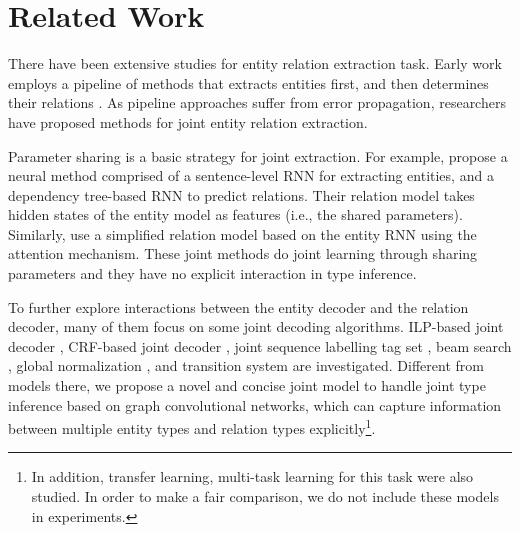 \section{Related Work}
There have been extensive studies for entity relation extraction task.
Early work employs a pipeline of methods that extracts entities first,
and then determines their relations \citep{zelenko2003kernel,miwa-EtAl:2009:EMNLP,chan-roth:2011:ACL-HLT2011,lin-EtAl:2016:P16-1}.
As pipeline approaches suffer from error propagation, 
researchers have proposed methods for joint entity relation extraction.

Parameter sharing is a basic strategy for joint extraction.
For example,
\citet{miwa-bansal:2016:P16-1} propose a neural method comprised of 
a sentence-level RNN for extracting entities,
and a dependency tree-based RNN to predict relations.
Their relation model takes hidden states of the entity model as features
(i.e., the shared parameters).
Similarly,
\citet{katiyar-cardie:2017:Long} use a simplified relation model
based on the entity RNN using the attention mechanism.
These joint methods do joint learning through sharing parameters and they have no explicit interaction in type inference. 

To further explore interactions between the entity decoder
and the relation decoder,
many of them focus on some joint decoding algorithms.
ILP-based joint decoder \cite{yang2013joint},
CRF-based joint decoder \cite{katiyar-cardie:2016:P16-1},
joint sequence labelling tag set \cite{zheng-EtAl:2017:Long},
beam search \cite{li-ji:2014:P14-1},
global normalization \cite{zhang-zhang-fu:2017:EMNLP2017},
and transition system \cite{wang2018joint} are investigated.
Different from models there, we propose a novel and concise
joint model to handle joint type inference based on 
graph convolutional networks,
which can capture information between multiple entity types 
and relation types explicitly\footnote{In addition, 
transfer learning\cite{sun2019distantly}, multi-task learning \cite{sanh2018hierarchical} for this task were also studied.
In order to make a fair comparison,
we do not include these models in experiments.}.



